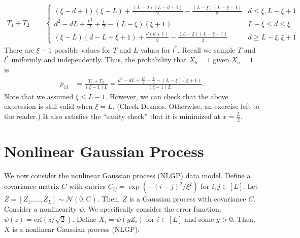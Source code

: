 \documentclass{article}
\begin{document}
\begin{align*}
  T_1 + T_2
  &= 
  \begin{cases}
    (\xi - d + 1) (\xi - L) + \frac{(L-d)(L-d+1)}{2} - \frac{(L-\xi)(L-\xi-1)}{2} & d \leq \xi, L - \xi + 1 \\
    d^2 - dL + \frac{L^2}{2} + \frac{L}{2} - (L-\xi) (\xi+1) & L - \xi \leq d \leq \xi \\
    (\xi - L) (d - L + \xi + 1) + \frac{d(d+1)}{2} - \frac{(L-\xi)(L-\xi-1)}{2} & d \geq L - \xi, \xi + 1
  \end{cases}
\end{align*}
There are $\xi - 1$ possible values for $T$ and $L$ values for $l^*$.
Recall we sample $T$ and $l^*$ uniformly and independently.
Thus, the probability that $X_b = 1$ given $X_a = 1$ is
\begin{align}
  p_{11}
  &= \frac{T_1 + T_2}{(\xi - 1) L}
  = \frac{ d^2 - dL + \frac{L^2}{2} + \frac{L}{2} - (L-\xi) (\xi+1) }{ (\xi - 1) L }.
\end{align}
Note that we assumed $\xi \leq L-1$.
However, we can check that the above expression is still valid when $\xi = L$.
(Check Desmos. 
Otherwise, an exercise left to the reader.)
It also satisfies the ``sanity check'' that it is minimized at $x = \frac{L}{2}$.


\section{Nonlinear Gaussian Process}
We now consider the nonlinear Gaussian process (NLGP) data model.
Define a covariance matrix $C$ with entries $C_{ij} = \exp(-(i-j)^2/\xi^2)$ for $i,j \in [L]$.
Let $Z = [Z_1, \ldots, Z_L] \sim \mathcal{N}(0, C)$.
Then, $Z$ is a Gaussian process with covariance $C$.
Consider a nonlinearity $\psi$.
We specifically consider the error function, $\psi(z) = \text{erf}(z / \sqrt{2})$.
Define $X_i = \psi(g Z_i)$ for $i \in [L]$ and some $g > 0$.
Then, $X$ is a nonlinear Gaussian process (NLGP).
\end{document}
